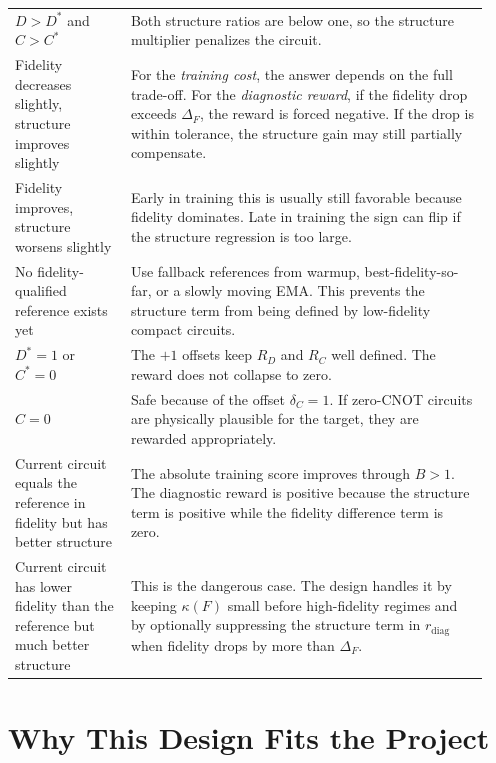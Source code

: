 \documentclass[11pt]{article}
\begin{document}
\begin{longtable}{>{\raggedright\arraybackslash}p{0.23\linewidth} >{\raggedright\arraybackslash}p{0.71\linewidth}}
$D>D^*$ and $C>C^*$ &
Both structure ratios are below one, so the structure multiplier penalizes the circuit. \\[4pt]

Fidelity decreases slightly, structure improves slightly &
For the \emph{training cost}, the answer depends on the full trade-off.
For the \emph{diagnostic reward}, if the fidelity drop exceeds $\Delta_F$, the reward is forced negative. If the drop is within tolerance, the structure gain may still partially compensate. \\[4pt]

Fidelity improves, structure worsens slightly &
Early in training this is usually still favorable because fidelity dominates.
Late in training the sign can flip if the structure regression is too large. \\[4pt]

No fidelity-qualified reference exists yet &
Use fallback references from warmup, best-fidelity-so-far, or a slowly moving EMA.
This prevents the structure term from being defined by low-fidelity compact circuits. \\[4pt]

$D^*=1$ or $C^*=0$ &
The $+1$ offsets keep $R_D$ and $R_C$ well defined.
The reward does not collapse to zero. \\[4pt]

$C=0$ &
Safe because of the offset $\delta_C=1$.
If zero-CNOT circuits are physically plausible for the target, they are rewarded appropriately. \\[4pt]

Current circuit equals the reference in fidelity but has better structure &
The absolute training score improves through $B>1$.
The diagnostic reward is positive because the structure term is positive while the fidelity difference term is zero. \\[4pt]

Current circuit has lower fidelity than the reference but much better structure &
This is the dangerous case.
The design handles it by keeping $\kappa(F)$ small before high-fidelity regimes and by optionally suppressing the structure term in $r_{\mathrm{diag}}$ when fidelity drops by more than $\Delta_F$. \\[4pt]

\end{longtable}

\section{Why This Design Fits the Project}
\end{document}
